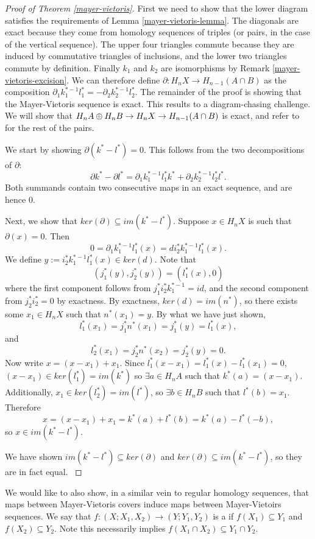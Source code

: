 \begin{proof}[Proof of Theorem \ref{mayer-vietoris}]
First we need to show that the lower diagram satisfies the requirements of Lemma \ref{mayer-vietoris-lemma}. The diagonals are exact because they come from homology sequences of triples (or pairs, in the case of the vertical sequence). The upper four triangles commute because they are induced by commutative triangles of inclusions, and the lower two triangles commute by definition. Finally $k_1$ and $k_2$ are isomorphisms by Remark \ref{mayer-vietoris-excision}. We can therefore define $\partial:H_nX\rightarrow H_{n-1}(A\cap B)$ as the composition $\partial_1k_1^{*-1}l_1^*=-\partial_2k_2^{*-1}l_2^*$. The remainder of the proof is showing that the Mayer-Vietoris sequence is exact. This results to a diagram-chasing challenge. We will show that $H_nA\oplus H_nB \rightarrow H_nX \rightarrow H_{n-1}(A\cap B)$ is exact, and refer to \cite{Eilenberg} for the rest of the pairs. 

We start by showing $\partial(k^*-l^*)=0$. This follows from the two decompositions of $\partial$:
$$\partial k^*-\partial l^*=\partial_1k_1^{*-1}l_1^*k^*+\partial_2k_2^{*-1}l_2^*l^*.$$ Both summands contain two consecutive maps in an exact sequence, and are hence $0$.

Next, we show that $ker(\partial)\subseteq im(k^*-l^*)$. Suppose $x\in H_nX$ is such that $\partial(x)=0$. Then $$0=\partial_1k_1^{*-1}l_1^*(x)=di^*_2k_1^{*-1}l_1^*(x).$$ We define $y:=i^*_2k_1^{*-1}l_1^*(x)\in ker(d)$. 
Note that $$(j_1^*(y),j_2^*(y))=(l_1^*(x),0)$$
where the first component follows from $j_1^*i^*_2k_1^{*-1}=id$, and the second component from $j_2^*i_2^*=0$ by exactness. By exactness, $ker(d)=im(n^*)$, so there exists some $x_1\in H_nX $ such that $n^*(x_1)=y$. By what we have just shown, $$l_1^*(x_1)=j_1^*n^*(x_1)=j_1^*(y)=l_1^*(x),$$ and $$l_2^*(x_1)=j_2^*n^*(x_2)=j_2^*(y)=0.$$ Now write $x=(x-x_1)+x_1$. Since $l_1^*(x-x_1)=l_1^*(x)-l_1^*(x_1)=0$, $(x-x_1)\in ker(l_1^*)=im(k^*)$ so $\exists a\in H_nA$ such that $k^*(a)=(x-x_1)$. Additionally, $x_1\in ker(l_2^*)=im(l^*)$, so $\exists b\in H_nB$ such that $l^*(b)=x_1$. Therefore $$x=(x-x_1)+x_1=k^*(a)+l^*(b)=k^*(a)-l^*(-b),$$ so $x\in im(k^*-l^*).$

We have shown $im(k^*-l^*)\subseteq ker(\partial)$ and $ker(\partial)\subseteq im(k^*-l^*)$, so they are in fact equal.
\cite{Eilenberg}
\end{proof}

We would like to also show, in a similar vein to regular homology sequences, that maps between Mayer-Vietoris covers induce maps between Mayer-Vietoirs sequences. We say that $f:(X;X_1,X_2)\rightarrow (Y;Y_1,Y_2)$ is a  if $f(X_1)\subseteq Y_1$ and $f(X_2)\subseteq Y_2$. Note this necessarily implies $f(X_1\cap X_2)\subseteq Y_1\cap Y_2$.

